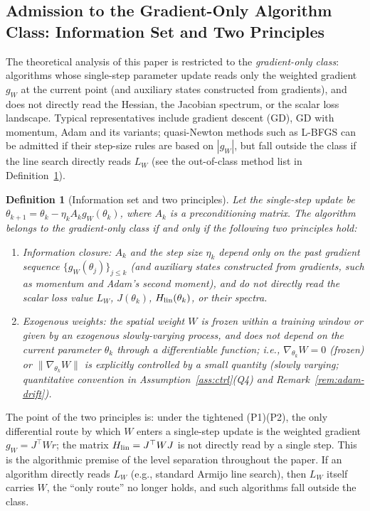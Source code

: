 \documentclass[11pt]{article}
\newcommand{\W}{W}
\newtheorem{definition}{Definition}[section]
\numberwithin{equation}{section}
\begin{document}
\subsection{Admission to the Gradient-Only Algorithm Class: Information Set and Two Principles}\label{sec:admit}
The theoretical analysis of this paper is restricted to the \emph{gradient-only class}: algorithms whose single-step parameter update reads only the weighted gradient $g_\W$ at the current point (and auxiliary states constructed from gradients), and does not directly read the Hessian, the Jacobian spectrum, or the scalar loss landscape. Typical representatives include gradient descent (GD), GD with momentum, Adam and its variants; quasi-Newton methods such as L-BFGS can be admitted if their step-size rules are based on $|g_\W|$, but fall outside the class if the line search directly reads $L_\W$ (see the out-of-class method list in Definition~\ref{def:admit}).

\begin{definition}[Information set and two principles]\label{def:admit}
Let the single-step update be $\theta_{k+1}=\theta_k-\eta_k A_k g_\W(\theta_k)$, where $A_k$ is a preconditioning matrix. The algorithm belongs to the gradient-only class if and only if the following two principles hold:
\begin{enumerate}[label=\textup{(P\arabic*)},leftmargin=2em]
\item \emph{Information closure}: $A_k$ and the step size $\eta_k$ depend only on the past gradient sequence $\{g_\W(\theta_j)\}_{j\le k}$ (and auxiliary states constructed from gradients, such as momentum and Adam's second moment), and do not directly read the scalar loss value $L_\W$, $J(\theta_k)$, $H_{\rm lin}(\theta_k)$, or their spectra.
\item \emph{Exogenous weights}: the spatial weight $\W$ is frozen within a training window or given by an exogenous slowly-varying process, and does not depend on the current parameter $\theta_k$ through a differentiable function; i.e., $\nabla_{\theta_k}\W=0$ (frozen) or $\|\nabla_{\theta_k}\W\|$ is explicitly controlled by a small quantity (slowly varying; quantitative convention in Assumption~\ref{ass:ctrl}(Q4) and Remark~\ref{rem:adam-drift}).
\end{enumerate}
\end{definition}

The point of the two principles is: under the tightened (P1)(P2), the only differential route by which $\W$ enters a single-step update is the weighted gradient $g_\W=J^\top\W r$; the matrix $H_{\rm lin}=J^\top\W J$ is not directly read by a single step. This is the algorithmic premise of the level separation throughout the paper. If an algorithm directly reads $L_\W$ (e.g., standard Armijo line search), then $L_\W$ itself carries $\W$, the ``only route'' no longer holds, and such algorithms fall outside the class.
\end{document}
